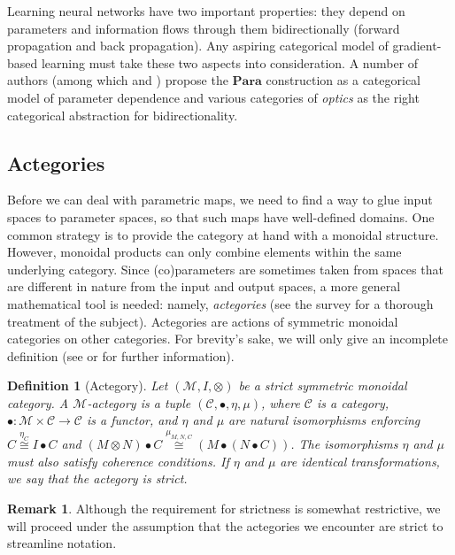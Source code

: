 \documentclass[11pt,a4paper,openright,twoside]{report}
\newcounter{mycounter}
\theoremstyle{plain}
\newtheorem{definition}[mycounter]{Definition}
\theoremstyle{definition}
\newtheorem{remark}[mycounter]{Remark}
\begin{document}
Learning neural networks have two important properties: they depend on parameters and information flows through them bidirectionally (forward propagation and back propagation). Any aspiring categorical model of gradient-based learning must take these two aspects into consideration. A number of authors (among which \cite{cruttwell2022categorical} and \cite{gavranovic2024fundamental}) propose the $\mathbf{Para}$ construction as a categorical model of parameter dependence and various categories of \textit{optics} as the right categorical abstraction for bidirectionality.

\subsection{Actegories}

Before we can deal with parametric maps, we need to find a way to glue input spaces to parameter spaces, so that such maps have well-defined domains. One common strategy is to provide the category at hand with a monoidal structure. However, monoidal products can only combine elements within the same underlying category. Since (co)parameters are sometimes taken from spaces that are different in nature from the input and output spaces, a more general mathematical tool is needed: namely, \textit{actegories} (see the survey \cite{capucci2022actegories} for a thorough treatment of the subject).  Actegories are actions of symmetric monoidal categories on other categories. For brevity's sake, we will only give an incomplete definition (see \cite{capucci2022actegories} or \cite{gavranovic2024fundamental} for further information).

\begin{definition}[Actegory]
  Let $(\mathcal{M},I,\otimes)$ be a strict symmetric monoidal category. A $\mathcal{M}$-actegory is a tuple $(\mathcal{C}, \bullet, \eta, \mu)$, where $\mathcal{C}$ is a category, $\bullet: \mathcal{M} \times \mathcal{C} \to \mathcal{C}$ is a functor, and $\eta$ and $\mu$ are natural isomorphisms enforcing $C \stackrel{\eta_C}{\cong}I \bullet C$ and $(M \otimes N) \bullet C \stackrel{\mu_{M,N,C}}{\cong} (M \bullet (N \bullet C))$.
  The isomorphisms $\eta$ and $\mu$ must also satisfy coherence conditions. If $\eta$ and $\mu$ are identical transformations, we say that the actegory is strict.
\end{definition}

\begin{remark}
  Although the requirement for strictness is somewhat restrictive, we will proceed under the assumption that the actegories we encounter are strict to streamline notation.
\end{remark}
\end{document}
